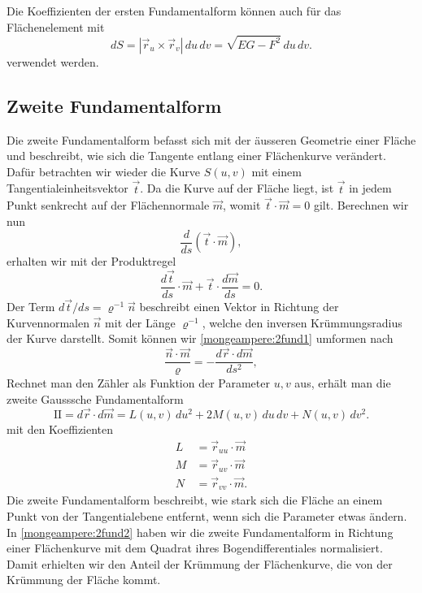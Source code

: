 Die Koeffizienten der ersten Fundamentalform können auch für das Flächenelement mit
\begin{equation}
  d S = |\vec r_u \times \vec r_v|\,d u \,d v = \!\sqrt{EG-F^2} \,d u \,d v.
  \label{mongeampere:ds}
\end{equation}
verwendet werden.

\subsection{Zweite Fundamentalform}
Die zweite Fundamentalform befasst sich mit der äusseren Geometrie einer 
Fläche und beschreibt, wie sich die Tangente entlang einer Flächenkurve verändert.
Dafür betrachten wir wieder die Kurve $S(u,v)$ mit einem Tangentialeinheitsvektor 
$\vec t$.
Da die Kurve auf der Fläche liegt, ist $\vec t$ in jedem Punkt senkrecht auf der 
Flächennormale $\vec m$, womit $\vec t \cdot \vec m = 0$ gilt. 
Berechnen wir nun 
\begin{equation}
  \frac{d }{d s}(\vec t \cdot \vec m),
  \label{mongeampere:2fund0}
\end{equation}
erhalten wir mit der Produktregel
\begin{equation}
  \frac{d \vec t}{d s} \cdot \vec m + \vec t \cdot \frac{d \vec m}{d s} = 0. 
  \label{mongeampere:2fund1}
\end{equation}
Der Term $d \vec t / d s = \varrho^{-1} \vec n$ beschreibt einen Vektor in Richtung der Kurvennormalen 
$\vec n$ mit der Länge $\varrho^{-1}$, welche den inversen Krümmungsradius der Kurve 
%
darstellt.
Somit können wir \eqref{mongeampere:2fund1} umformen nach
\begin{equation}
  \frac{\vec n \cdot \vec m}{\varrho} = - \frac{d \vec r \cdot d \vec m }{d s^2},
  \label{mongeampere:2fund2}
\end{equation}
Rechnet man den Zähler als Funktion der Parameter $u, v$ aus, erhält man die zweite 
Gausssche Fundamentalform
\begin{equation}
  \mathrm{I\!I} = d \vec r \cdot d \vec m  = L(u, v) \,d u^2 + 2 M (u,v) \,d u \,d v + N(u,v) \,d v^2.
  \label{mongeampere:2fund}
\end{equation}
mit den Koeffizienten
\begin{align*}
  L &= \vec r_{uu} \cdot \vec m \\ 
  M &= \vec r_{uv} \cdot \vec m \\
  N &= \vec r_{vv} \cdot \vec m.
  \label{mongeampere:2fundkoef}
\end{align*}
Die zweite Fundamentalform beschreibt, wie stark sich die Fläche an einem Punkt
von der Tangentialebene entfernt, wenn sich die Parameter etwas ändern.
%
In \eqref{mongeampere:2fund2} haben wir die zweite Fundamentalform in Richtung einer Flächenkurve mit
dem Quadrat ihres Bogendifferentiales normalisiert.
Damit erhielten wir den Anteil der Krümmung der Flächenkurve, die von der Krümmung der Fläche kommt.

